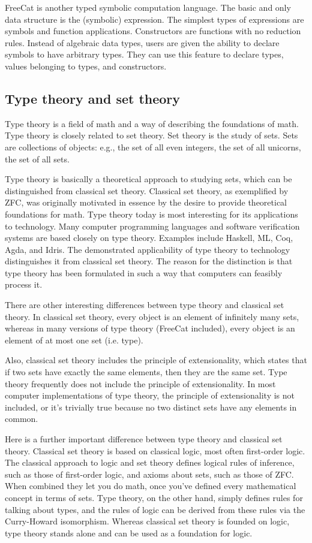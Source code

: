 \documentclass{article}
\begin{document}
FreeCat is another typed symbolic computation language. The basic and only data structure is the (symbolic) expression. The simplest types of expressions are symbols and function applications. Constructors are functions with no reduction rules. Instead of algebraic data types, users are given the ability to declare symbols to have arbitrary types. They can use this feature to declare types, values belonging to types, and constructors.

\subsection{Type theory and set theory}

Type theory is a field of math and a way of describing the foundations of math. Type theory is closely related to set theory. Set theory is the study of sets. Sets are collections of objects: e.g., the set of all even integers, the set of all unicorns, the set of all sets.

Type theory is basically a theoretical approach to studying sets, which can be distinguished from classical set theory. Classical set theory, as exemplified by ZFC, was originally motivated in essence by the desire to provide theoretical foundations for math. Type theory today is most interesting for its applications to technology. Many computer programming languages and software verification systems are based closely on type theory. Examples include Haskell, ML, Coq, Agda, and Idris. The demonstrated applicability of type theory to technology distinguishes it from classical set theory. The reason for the distinction is that type theory has been formulated in such a way that computers can feasibly process it.

There are other interesting differences between type theory and classical set theory. In classical set theory, every object is an element of infinitely many sets, whereas in many versions of type theory (FreeCat included), every object is an element of at most one set (i.e. type).

Also, classical set theory includes the principle of extensionality, which states that if two sets have exactly the same elements, then they are the same set. Type theory frequently does not include the principle of extensionality. In most computer implementations of type theory, the principle of extensionality is not included, or it's trivially true because no two distinct sets have any elements in common.

Here is a further important difference between type theory and classical set theory. Classical set theory is based on classical logic, most often first-order logic. The classical approach to logic and set theory defines logical rules of inference, such as those of first-order logic, and axioms about sets, such as those of ZFC. When combined they let you do math, once you've defined every mathematical concept in terms of sets. Type theory, on the other hand, simply defines rules for talking about types, and the rules of logic can be derived from these rules via the Curry-Howard isomorphism. Whereas classical set theory is founded on logic, type theory stands alone and can be used as a foundation for logic.
\end{document}
